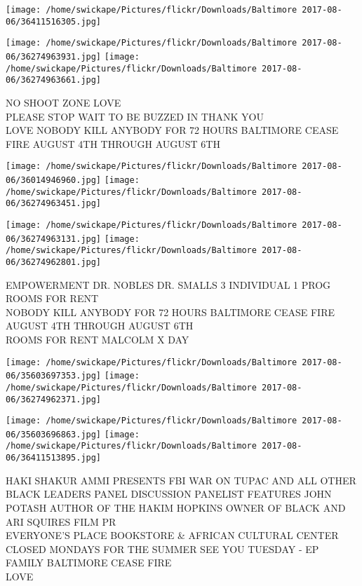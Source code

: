 \documentclass[10pt,letterpaper]{article}
\begin{document}
\texttt{[image: /home/swickape/Pictures/flickr/Downloads/Baltimore 2017-08-06/36411516305.jpg]}

\vspace{0.25in}
\texttt{[image: /home/swickape/Pictures/flickr/Downloads/Baltimore 2017-08-06/36274963931.jpg]}
\texttt{[image: /home/swickape/Pictures/flickr/Downloads/Baltimore 2017-08-06/36274963661.jpg]}

NO SHOOT ZONE LOVE\\
PLEASE STOP WAIT TO BE BUZZED IN THANK YOU\\
LOVE NOBODY KILL ANYBODY FOR 72 HOURS BALTIMORE CEASE FIRE AUGUST 4TH THROUGH AUGUST 6TH\\
\pagebreak

\texttt{[image: /home/swickape/Pictures/flickr/Downloads/Baltimore 2017-08-06/36014946960.jpg]}
\texttt{[image: /home/swickape/Pictures/flickr/Downloads/Baltimore 2017-08-06/36274963451.jpg]}

\texttt{[image: /home/swickape/Pictures/flickr/Downloads/Baltimore 2017-08-06/36274963131.jpg]}
\texttt{[image: /home/swickape/Pictures/flickr/Downloads/Baltimore 2017-08-06/36274962801.jpg]}

EMPOWERMENT DR. NOBLES DR. SMALLS 3 INDIVIDUAL 1 PROG\\
ROOMS FOR RENT\\
NOBODY KILL ANYBODY FOR 72 HOURS BALTIMORE CEASE FIRE AUGUST 4TH THROUGH AUGUST 6TH\\
ROOMS FOR RENT MALCOLM X DAY\\
\pagebreak

\texttt{[image: /home/swickape/Pictures/flickr/Downloads/Baltimore 2017-08-06/35603697353.jpg]}
\texttt{[image: /home/swickape/Pictures/flickr/Downloads/Baltimore 2017-08-06/36274962371.jpg]}

\texttt{[image: /home/swickape/Pictures/flickr/Downloads/Baltimore 2017-08-06/35603696863.jpg]}
\texttt{[image: /home/swickape/Pictures/flickr/Downloads/Baltimore 2017-08-06/36411513895.jpg]}

HAKI SHAKUR AMMI PRESENTS FBI WAR ON TUPAC AND ALL OTHER BLACK LEADERS PANEL DISCUSSION PANELIST FEATURES JOHN POTASH AUTHOR OF THE HAKIM HOPKINS OWNER OF BLACK AND ARI SQUIRES FILM PR\\
EVERYONE'S PLACE BOOKSTORE \& AFRICAN CULTURAL CENTER\\
CLOSED MONDAYS FOR THE SUMMER SEE YOU TUESDAY {-} EP FAMILY BALTIMORE CEASE FIRE\\
LOVE\\
\pagebreak
\end{document}
